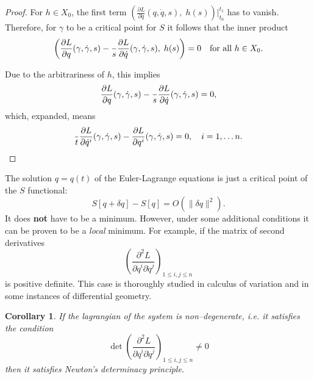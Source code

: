 \documentclass[english,fontsize=11pt,paper=a5,oneside]{scrbook}
\let\d\relax
\DeclareMathOperator{\d}{d}
\newtheorem{corollary}[theorem]{Corollary}
\theoremstyle{definition}
\newenvironment{remark}
  {\pushQED{\qed}\renewcommand{\qedsymbol}{$\lozenge$}\remarkx}
  {\popQED\endremarkx}
\begin{document}
\begin{proof}
    For $h\in X_0$, the first term $\left(\frac{\partial L}{\partial \dot q}(q, \dot q, s),\; h(s)\right)\Big|_{t_0}^{t_1}$ has to vanish. Therefore, for $\gamma$ to be a critical point for $S$ it follows that the inner product
    \begin{equation}
        \left(
            \frac{\partial L}{\partial q}(\gamma, \dot \gamma, s)
            - \frac{\d}{\d s}\frac{\partial L}{\partial \dot q}(\gamma, \dot \gamma, s)
        ,\; h(s)\right) = 0 \quad\mbox{for all } h\in X_0.
    \end{equation}

    Due to the arbitrariness of $h$, this implies
    \begin{equation}
        \frac{\partial L}{\partial q}(\gamma, \dot \gamma, s)
            - \frac{\d}{\d s}\frac{\partial L}{\partial \dot q}(\gamma, \dot \gamma, s) = 0,
    \end{equation}
    which, expanded, means
    \begin{equation}
        \frac{\d}{\d t}\frac{\partial L}{\partial \dot q^i}(\gamma, \dot \gamma, s) - \frac{\partial L}{\partial q^i}(\gamma, \dot \gamma, s) = 0, \quad i=1,\ldots n.
    \end{equation}
\end{proof}

\begin{remark}
    The solution $q=q(t)$ of the Euler-Lagrange equations is just a critical point of the $S$ functional:
    \begin{equation}
        S[q + \delta q] - S[q] = O(\|\delta q\|^2).
    \end{equation}
    It does \textbf{not} have to be a minimum. However, under some additional conditions it can be proven to be a \emph{local} minimum.
    For example, if the matrix of second derivatives
    \begin{equation}
        \left(
            \frac{\partial^2 L}{\partial\dot q^i \partial\dot q^j}
        \right)_{1\leq i,j\leq n}
    \end{equation}
    is positive definite.
    This case is thoroughly studied in calculus of variation and in some instances of differential geometry.
\end{remark}

\begin{corollary}
    If the lagrangian of the system is \emph{non--degenerate}, i.e. it satisfies the condition
    \begin{equation}
            \det \left(\frac{\partial^2 L}{\partial\dot q^i \partial\dot q^j}
        \right)_{1\leq i,j\leq n} \neq 0
    \end{equation}
    then it satisfies Newton's determinacy principle.
\end{corollary}
\end{document}
